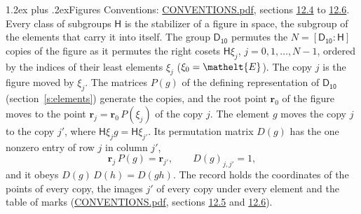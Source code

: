 \documentclass[10pt,a4paper]{article}
\makeatletter
\renewcommand\section{\@startsection{section}{1}{\z@}{-3ex plus -1ex minus -.2ex}%
  {1.2ex plus .2ex}{\normalfont\large\sffamily\bfseries\color{parttitle}}}
\numberwithin{equation}{section}
\newcommand{\eltfont}[1]{{\let\sigma\eltsigma\mathelt{#1}}}
\newcommand{\grp}[1]{\mathsf{#1}}
\newcommand{\cls}[1]{\eltfont{#1}}
\newcommand{\pointr}{\mathbf{r}}
\makeatother
\begin{document}
\section{Figures}\label{s:permutation}
Conventions: \href{../../CONVENTIONS.pdf}{CONVENTIONS.pdf}, sections \href{../../CONVENTIONS.pdf\#conv.12.4}{12.4} to \href{../../CONVENTIONS.pdf\#conv.12.6}{12.6}.
Every class of subgroups $\grp{H}$ is the stabilizer of a figure in space, the subgroup of the elements that carry it into itself. \label{n:local.orbit.size}\label{n:element.coset.least}\label{n:index.coset}The group $\grp{D_{10}}$ permutes the $N = [\grp{D_{10}} : \grp{H}]$ copies of the figure as it permutes the right cosets $\grp{H}\xi_j$, $j = 0, 1, \dots, N - 1$, ordered by the indices of their least elements $\xi_j$ ($\xi_0 = \cls{E}$). The copy $j$ is the figure moved by $\xi_j$. The matrices $P(g)$ of the defining representation of $\grp{D_{10}}$ (section~\ref{s:elements}) generate the copies, and the root point $\pointr_0$ of the figure moves to the point $\pointr_j = \pointr_0\, P(\xi_j)$ of the copy $j$. \label{n:local.coset.image}The element $g$ moves the copy $j$ to the copy $j'$, where $\grp{H}\xi_j g = \grp{H}\xi_{j'}$. \label{n:local.matrix.permutation}Its permutation matrix $D(g)$ has the one nonzero entry of row $j$ in column $j'$,
\begin{equation}\label{e:perm.matrix}\pointr_j\, P(g) = \pointr_{j'}, \qquad D(g)_{j,j'} = 1,\end{equation}
and it obeys $D(g)\, D(h) = D(gh)$. The record holds the coordinates of the points of every copy, the images $j'$ of every copy under every element and the table of marks (\href{../../CONVENTIONS.pdf}{CONVENTIONS.pdf}, sections \href{../../CONVENTIONS.pdf\#conv.12.5}{12.5} and \href{../../CONVENTIONS.pdf\#conv.12.6}{12.6}).
\end{document}
